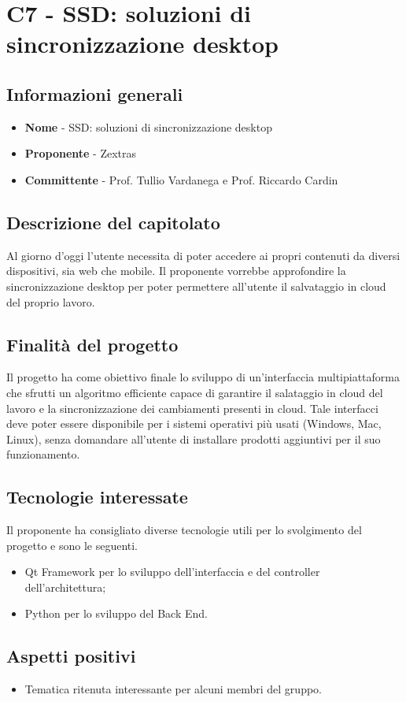 \chapter{C7 - SSD: soluzioni di sincronizzazione desktop}
\section{Informazioni generali}
\begin{itemize}
	\item \textbf{Nome} - SSD: soluzioni di sincronizzazione desktop
	\item \textbf{Proponente} - Zextras
	\item \textbf{Committente} - Prof. Tullio Vardanega e Prof. Riccardo Cardin
\end{itemize}
\section{Descrizione del capitolato}
Al giorno d'oggi l'utente necessita di poter accedere ai propri contenuti da diversi dispositivi, sia web che mobile. Il proponente vorrebbe approfondire la sincronizzazione desktop per poter permettere all'utente il salvataggio in cloud del proprio lavoro.
\section{Finalità del progetto}
Il progetto ha come obiettivo finale lo sviluppo di un'interfaccia multipiattaforma che sfrutti un algoritmo efficiente capace di garantire il salataggio in cloud del lavoro e la sincronizzazione dei cambiamenti presenti in cloud. Tale interfacci deve poter essere disponibile per i sistemi operativi più usati (Windows, Mac, Linux), senza domandare all'utente di installare prodotti aggiuntivi per il suo funzionamento. 
\section{Tecnologie interessate}
Il proponente ha consigliato diverse tecnologie utili per lo svolgimento del progetto e sono le seguenti.
\begin{itemize}
	\item Qt Framework per lo sviluppo dell'interfaccia e del controller dell'architettura;
	\item Python per lo sviluppo del Back End.
\end{itemize}
\section{Aspetti positivi}
\begin{itemize}
	\item Tematica ritenuta interessante per alcuni membri del gruppo.
\end{itemize}
